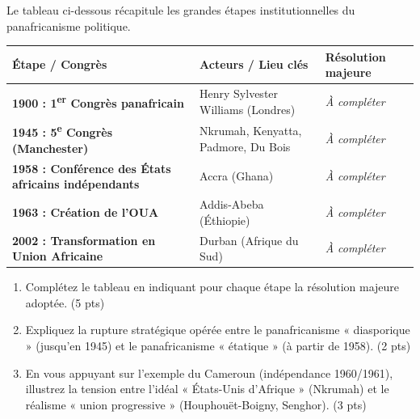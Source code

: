 \documentclass[11pt]{article}
\begin{document}
\begin{exercice}
Le tableau ci-dessous récapitule les grandes étapes institutionnelles du panafricanisme politique.
\begin{center}
\begin{tabularx}{\linewidth}{>{\bfseries}l X l}
\hline
\textbf{Étape / Congrès} & \textbf{Acteurs / Lieu clés} & \textbf{Résolution majeure} \\
\hline
1900 : 1\textsuperscript{er} Congrès panafricain & Henry Sylvester Williams (Londres) & \textit{À compléter} \\
1945 : 5\textsuperscript{e} Congrès (Manchester) & Nkrumah, Kenyatta, Padmore, Du Bois & \textit{À compléter} \\
1958 : Conférence des États africains indépendants & Accra (Ghana) & \textit{À compléter} \\
1963 : Création de l'OUA & Addis-Abeba (Éthiopie) & \textit{À compléter} \\
2002 : Transformation en Union Africaine & Durban (Afrique du Sud) & \textit{À compléter} \\
\hline
\end{tabularx}
\end{center}
\begin{enumerate}
    \item Complétez le tableau en indiquant pour chaque étape la résolution majeure adoptée. (5 pts)
    \item Expliquez la rupture stratégique opérée entre le panafricanisme « diasporique » (jusqu'en 1945) et le panafricanisme « étatique » (à partir de 1958). (2 pts)
    \item En vous appuyant sur l'exemple du Cameroun (indépendance 1960/1961), illustrez la tension entre l'idéal « États-Unis d'Afrique » (Nkrumah) et le réalisme « union progressive » (Houphouët-Boigny, Senghor). (3 pts)
\end{enumerate}
\end{exercice}
\end{document}
